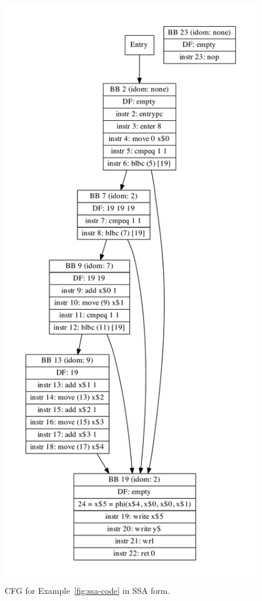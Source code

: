 \documentclass[10pt,twocolumn]{article}
\begin{document}
\begin{figure}
\begin{center}
  \includegraphics[width=0.95\columnwidth]{figs/simple6-ssa.pdf}
\begin{minipage}{0.95\columnwidth}
  \caption{\label{fig:ssa} CFG for Example~\ref{fig:ssa-code} in SSA form.}
\end{minipage}
\end{center}
\end{figure}
\end{document}
